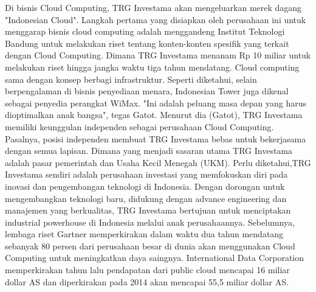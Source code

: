 \tab Di bisnis Cloud Computing, TRG Investama akan mengeluarkan merek dagang "Indonesian Cloud". Langkah pertama yang disiapkan oleh perusahaan ini untuk menggarap bisnis cloud computing adalah menggandeng Institut Teknologi Bandung untuk melakukan riset tentang konten-konten spesifik yang terkait dengan Cloud Computing. Dimana TRG Investama menanam Rp 10 miliar untuk melakukan riset hingga jangka waktu tiga tahun mendatang. Cloud computing sama dengan konsep berbagi infrastruktur. Seperti diketahui, selain berpengalaman di bisnis penyediaan menara, Indonesian Tower juga dikenal sebagai penyedia perangkat WiMax. "Ini adalah peluang masa depan yang harus dioptimalkan anak bangsa", tegas Gatot. Menurut dia (Gatot), TRG Investama memiliki keunggulan independen sebagai perusahaan Cloud Computing. \\Pasalnya, posisi independen membuat TRG Investama bebas untuk bekerjasama dengan semua lapisan. Dimana yang menjadi sasaran utama TRG Investama adalah pasar pemerintah dan Usaha Kecil Menegah (UKM). Perlu diketahui,TRG Investama sendiri adalah perusahaan investasi yang memfokuskan diri pada inovasi dan pengembangan teknologi di Indonesia. Dengan dorongan untuk mengembangkan teknologi baru, didukung dengan advance engineering dan manajemen yang berkualitas, TRG Investama bertujuan untuk menciptakan industrial powerhouse di Indonesia melalui anak perusahaannya. Sebelumnya, lembaga riset Gartner memperkirakan dalam waktu dua tahun mendatang sebanyak 80 persen dari perusahaan besar di dunia akan menggunakan Cloud Computing untuk meningkatkan daya saingnya. International Data Corporation memperkirakan tahun lalu pendapatan dari public cloud mencapai 16 miliar dollar AS dan diperkirakan pada 2014 akan mencapai 55,5 miliar dollar AS.
